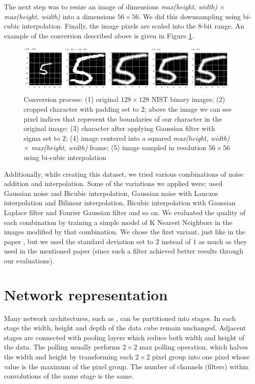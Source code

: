 \documentclass[eng]{simposium}
\begin{document}
The next step was to resize an image of dimensions \textit{max(height, width)} $\times$ \textit{max(height, width)} into a  
dimensions $56 \times 56$. 
We did this downsampling using bi-cubic interpolation.  
Finally, the image pixels are scaled into the 8-bit range.  
An example of the conversion described above is given in Figure \ref{fig:conversion}.  

\begin{figure}[!ht] 
  \includegraphics[width=1\textwidth]{conversion.png} 
  \centering 
  \caption{Conversion process:  
(1) original $128 \times 128$ NIST binary images;  
(2) cropped character with padding set to $2$; above the image we can see pixel indices that represent the boundaries of our character in the original image;  
(3) character after applying Gaussian filter with sigma set to $2$;  
(4) image centered into a squared \textit{max(height, width)} $\times$ \textit{max(height, width)} frame;  
(5) image sampled in resolution $56 \times 56$ using bi-cubic interpolation} 
  \label{fig:conversion} 
\end{figure} 

Additionally, while creating this dataset, we tried various combinations of noise addition and interpolation.  
Some of the variations we applied were: used Gaussian noise and Bicubic interpolation, Gaussian noise with Lanczos interpolation  
and Bilinear interpolation, Bicubic interpolation with Gaussian Laplace filter and Fourier Gaussian filter and so on.  
We evaluated the quality of each combination by training a simple model of K Nearest Neighbors in the images modified by that  
combination. We chose the first variant, just like in the paper \cite{1}, but we used the standard deviation set to $2$  
instead of $1$ as much as they used in the mentioned paper (since such a filter achieved better results through our evaluations).  

\section{Network representation} 
\label{sec:repr} 

Many network architectures, such as \cite{6}\cite{7}, can be partitioned into stages. 
In each stage the width, height and depth of the data cube remain unchanged.  
Adjacent stages are connected with pooling layers which reduce both width and height of the data. 
The polling usually performs $2 \times 2$ max polling operation, which halves the width and height by transforming each $2 \times 2$  
pixel group into one pixel whose value is the maximum of the pixel group. 
The number of channels (filters) within convolutions of the same stage is the same. 
\end{document}
